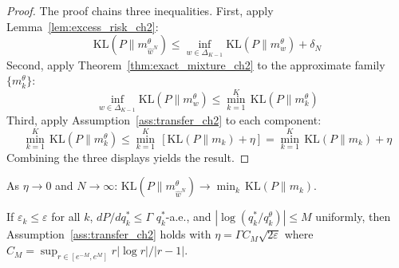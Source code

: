     \begin{proof}
    The proof chains three inequalities. First, apply Lemma~\ref{lem:excess_risk_ch2}:
    \begin{equation}
        \mathrm{KL}(P \| m^\theta_{\hat{w}^N}) \leq \inf_{w \in \Delta_{K-1}} \mathrm{KL}(P \| m^\theta_w) + \delta_N
    \end{equation}
    Second, apply Theorem~\ref{thm:exact_mixture_ch2} to the approximate family $\{m^\theta_k\}$:
    \begin{equation}
        \inf_{w \in \Delta_{K-1}} \mathrm{KL}(P \| m^\theta_w) \leq \min_{k=1}^K\, \mathrm{KL}(P \| m^\theta_k)
    \end{equation}
    Third, apply Assumption~\ref{ass:transfer_ch2} to each component:
    \begin{equation}
        \min_{k=1}^K\, \mathrm{KL}(P \| m^\theta_k) \leq \min_{k=1}^K\, \left[\mathrm{KL}(P \| m_k) + \eta\right] = \min_{k=1}^K\, \mathrm{KL}(P \| m_k) + \eta
    \end{equation}
    Combining the three displays yields the result.
    \end{proof}

    \begin{corollary}
    \label{cor:recovery_ch2}
    As $\eta \to 0$ and $N \to \infty$: $\mathrm{KL}(P \| m^\theta_{\hat{w}^N}) \to \min_k\, \mathrm{KL}(P \| m_k)$.
    \end{corollary}

    \begin{proposition}
    \label{prop:sqrt_eps_ch2}
    If $\varepsilon_k \leq \varepsilon$ for all $k$, $dP/dq^*_k \leq \Gamma$ $q^*_k$-a.e., and $|\log(q^*_k/q^\theta_k)| \leq M$ uniformly, then Assumption~\ref{ass:transfer_ch2} holds with $\eta = \Gamma C_M \sqrt{2\varepsilon}$ where $C_M = \sup_{r \in [e^{-M}, e^M]} r|\log r|/|r-1|$.
    \end{proposition}

